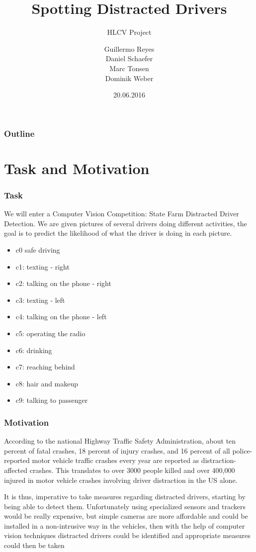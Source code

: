 \documentclass{beamer}
\title{Spotting Distracted Drivers}
\subtitle{HLCV Project}
\author{ Guillermo Reyes \\
	 Daniel Schaefer \\
	 Marc Tonsen \\
	 Dominik Weber\\}
\institute{Saarland University}
\date{20.06.2016}
\begin{document}
	\begin{frame}
		\titlepage
	\end{frame}
	
	\begin{frame}
		\frametitle{Outline}
		\tableofcontents
	\end{frame}
	
	\section{Task and Motivation}	
	\begin{frame}
		\frametitle{Task}
		We will enter a Computer Vision Competition: State Farm Distracted Driver Detection. We are given pictures of several drivers doing different activities, the  goal is to predict the likelihood of what the driver is doing in each picture.
		\begin{itemize}
			\item c0 safe driving
			\item c1: texting - right
			\item c2: talking on the phone - right
			\item c3: texting - left
			\item c4: talking on the phone - left
			\item c5: operating the radio
			\item c6: drinking
			\item c7: reaching behind
			\item c8: hair and makeup
			\item c9: talking to passenger			
		\end{itemize}
	\end{frame}
	
	\begin{frame}
		\frametitle{Motivation}
		According to the national Highway Traffic Safety Administration, about ten percent of fatal crashes, 18 percent of injury crashes, and
		16 percent of all police-reported motor vehicle traffic crashes
		every year are reported as distraction-affected crashes. This translates to over 3000 people killed and over 400,000 injured in motor vehicle crashes involving driver distraction in the US alone.
		
		It is thus, imperative to take measures regarding distracted drivers, starting by being able to detect them. Unfortunately using specialized sensors and trackers would be really expensive, but simple cameras are more affordable and could be installed in a non-intrusive way in the vehicles, then with the help of computer vision techniques distracted drivers could be identified and appropriate measures could then be taken
	\end{frame}
	
\end{document}
